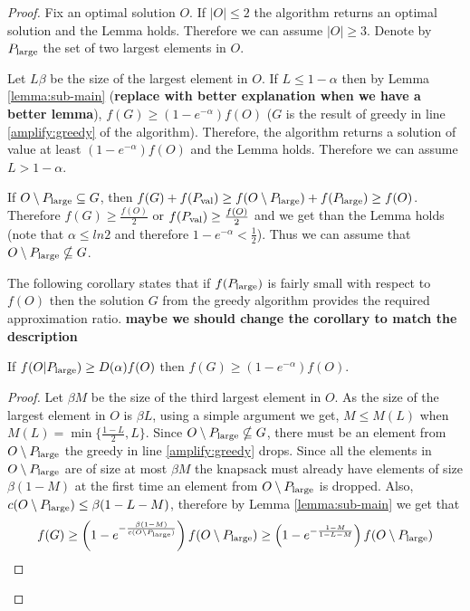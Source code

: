 \begin{proof}

	Fix an optimal solution $O$.
	 If $|O|\leq 2$ the algorithm returns an optimal solution and the Lemma holds.
	Therefore we can assume $|O| \geq 3$.  Denote by $P_{\text{large}}$ the set of  two largest elements in $O$.
	
	Let $L\beta$ be the size of the largest element in $O$.  If $L\leq 1-\alpha$ then
	by Lemma \ref{lemma:sub-main} ({\bf replace with better explanation when we have a better lemma}), $f(G) \geq (1-e^{-\alpha}) f(O)$  ($G$ is the result of 
	greedy  in line \ref{amplify:greedy} of the algorithm). Therefore, the algorithm
	returns a solution of value at least $(1-e^{-\alpha})f(O)$ and the Lemma holds. Therefore we can assume  $L> 1-\alpha$.
	
	If $O\setminus P_{\text{large}} \subseteq G$, then
	$f(G)+ f(P_{\text{val}})\geq f(O\setminus P_{\text{large}}) + f(P_{\text{large}}) \geq f(O)$.
	Therefore $f(G)\geq \frac{f(O)}{2}$ or $f(P_{\text{val}})\geq \frac{f(O)}{2}$ 
	and we get than the Lemma holds (note that $\alpha \leq ln 2$ and therefore
	$1-e^{-\alpha} < \frac{1}{2}$). Thus we can assume that 
	$O\setminus P_{\text{large}} \nsubseteq G$.
	
	The following corollary states that if $f(P_{\text{large}})$ is fairly small
	with respect to $f(O)$ then the solution $G$ from the greedy algorithm provides
	the required approximation ratio. {\bf maybe we should change the corollary to match the description}
	
	\begin{corollary}
		\label{corollary:cor1}
	If $f(O|P_{\text{large}}) \geq D(\alpha) f(O)$ then $f(G)\geq (1-e^{-\alpha})f(O)$.
	\end{corollary}

\begin{proof}
	

	Let $\beta M$ be the size of the third largest element in $O$.
	As the size of the largest element in $O$ is $\beta L$, 
	using a simple argument we get, $M\leq M(L)$ when $M(L)= \min \{\frac{1-L}{2}, L\}$. Since 
	$O\setminus P_{\text{large}} \nsubseteq G$, there must be an element from $O \setminus P_{\text{large}}$ the greedy in line \ref{amplify:greedy} drops. Since all the elements 
	in $O\setminus P_{\text{large}}$ are of size at most $\beta M$ the knapsack must 
	already have elements of size $\beta (1-M)$ at the first time an element from $O\setminus P_{\text{large}}$ is dropped. Also, $c(O\setminus P_{\text{large}}) \leq \beta(1-L -M)$, therefore by Lemma \ref{lemma:sub-main} we get that 
  	$$f(G)\geq \left(1-e^{- \frac{\beta (1-M) }{c(O\setminus P_{\text{large}})}}\right) f(O\setminus P_{\text{large}})
  			\geq \left(1-e^{- \frac{1-M }{1-L-M}}\right) f(O\setminus P_{\text{large}}) $$
  			

\end{proof}
\end{proof}
